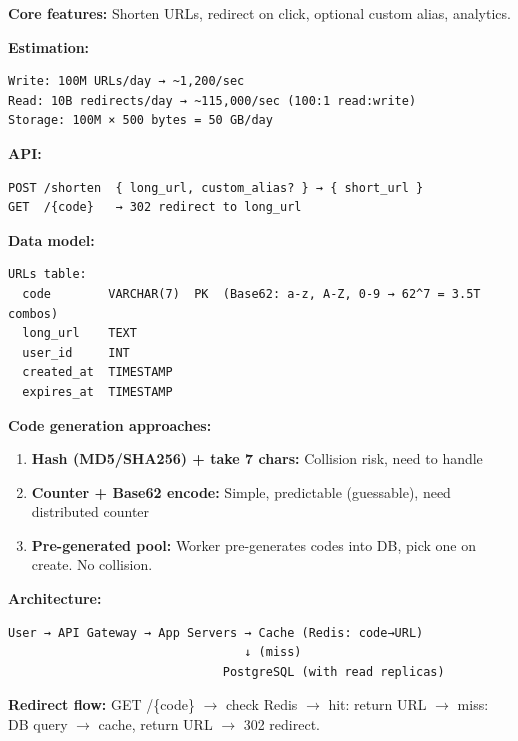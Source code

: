 \documentclass[11pt]{article}
\providecommand{\tightlist}{\setlength{\itemsep}{1pt}\setlength{\parskip}{0pt}}
\begin{document}
\textbf{Core features:} Shorten URLs, redirect on click, optional custom alias, analytics.

\textbf{Estimation:}

\setcodelang{}

\begin{verbatim}
Write: 100M URLs/day → ~1,200/sec
Read: 10B redirects/day → ~115,000/sec (100:1 read:write)
Storage: 100M × 500 bytes = 50 GB/day
\end{verbatim}

\textbf{API:}

\setcodelang{}

\begin{verbatim}
POST /shorten  { long_url, custom_alias? } → { short_url }
GET  /{code}   → 302 redirect to long_url
\end{verbatim}

\textbf{Data model:}

\setcodelang{}

\begin{verbatim}
URLs table:
  code        VARCHAR(7)  PK  (Base62: a-z, A-Z, 0-9 → 62^7 = 3.5T combos)
  long_url    TEXT
  user_id     INT
  created_at  TIMESTAMP
  expires_at  TIMESTAMP
\end{verbatim}

\textbf{Code generation approaches:}

\begin{enumerate}
\def\labelenumi{\arabic{enumi}.}
\tightlist
\item
  \textbf{Hash (MD5/SHA256) + take 7 chars:} Collision risk, need to handle
\item
  \textbf{Counter + Base62 encode:} Simple, predictable (guessable), need distributed counter
\item
  \textbf{Pre-generated pool:} Worker pre-generates codes into DB, pick one on create. No collision.
\end{enumerate}

\textbf{Architecture:}

\setcodelang{}

\begin{verbatim}
User → API Gateway → App Servers → Cache (Redis: code→URL)
                                 ↓ (miss)
                              PostgreSQL (with read replicas)
\end{verbatim}

\textbf{Redirect flow:} GET /\{code\} \(\rightarrow\) check Redis \(\rightarrow\) hit: return URL \(\rightarrow\) miss: DB query \(\rightarrow\) cache, return URL \(\rightarrow\) 302 redirect.
\end{document}
